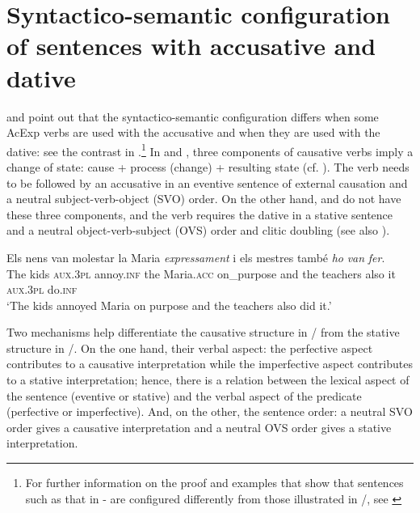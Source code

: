 \documentclass[output=paper,colorlinks,citecolor=brown,modfonts,nonflat]{langsci/langscibook}
\begin{document}
\section{Syntactico-semantic configuration of sentences with accusative and dative}\label{sec:royo:2}

\citet{Ynglès1991} and \citet{CabréMateu1998} point out that the syntactico-semantic configuration differs when some AcExp verbs are used with the accusative and when they are used with the dative: see the contrast in .\footnote{For further information on the proof and examples that show that sentences such as that in  - are configured differently from those illustrated in /, see \citet[Section 4.1]{Royo2017}} In  and , three components of causative verbs imply a change of state: cause + process (change) + resulting state (cf. \citealt{LevinRappaportHovav1995, CabréMateu1998, Rossello2008}). The verb needs to be followed by an accusative in an eventive sentence of external causation and a neutral subject-verb-object (SVO) order. On the other hand,  and  do not have these three components, and the verb requires the dative in a stative sentence and a neutral object-verb-subject (OVS) order and clitic doubling (see also ).

\ea%
 \label{ex:royo:3}
 \ea \label{ex:royo:3a}
 \gll Els nens van molestar la Maria \emph{expressament} i els mestres també \emph{ho} \emph{van} \emph{fer}. \\
The kids \textsc{aux.3pl} annoy.\textsc{inf} the Maria.\textsc{acc} on\_purpose     and the teachers also     it  \textsc{aux.3pl} do.\textsc{inf}\\
 \glt ‘The kids annoyed Maria on purpose and the teachers also did it.’
 
 \z
 \z

Two mechanisms help differentiate the causative structure in / from the stative structure in /. On the one hand, their verbal aspect: the perfective aspect contributes to a causative interpretation while the imperfective aspect contributes to a stative interpretation; hence, there is a relation between the lexical aspect of the sentence (eventive or stative) and the verbal aspect of the predicate (perfective or imperfective). And, on the other, the sentence order: a neutral SVO order gives a causative interpretation and a neutral OVS order gives a stative interpretation.
\end{document}
